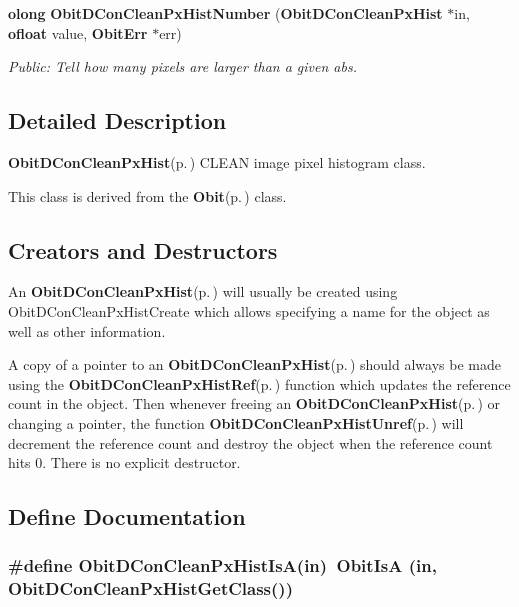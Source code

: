 \begin{CompactItemize}
{\bf olong} {\bf Obit\-DCon\-Clean\-Px\-Hist\-Number} ({\bf Obit\-DCon\-Clean\-Px\-Hist} $\ast$in, {\bf ofloat} value, {\bf Obit\-Err} $\ast$err)
\begin{CompactList}\small\item\em Public: Tell how many pixels are larger than a given abs. \item\end{CompactList}\end{CompactItemize}


\subsection{Detailed Description}
{\bf Obit\-DCon\-Clean\-Px\-Hist}{\rm (p.\,\pageref{structObitDConCleanPxHist})} CLEAN image pixel histogram class. 

This class is derived from the {\bf Obit}{\rm (p.\,\pageref{structObit})} class.\subsection{Creators and Destructors}\label{ObitDConCleanPxHist_8h_ObitDConCleanPxHistaccess}
An {\bf Obit\-DCon\-Clean\-Px\-Hist}{\rm (p.\,\pageref{structObitDConCleanPxHist})} will usually be created using Obit\-DCon\-Clean\-Px\-Hist\-Create which allows specifying a name for the object as well as other information.

A copy of a pointer to an {\bf Obit\-DCon\-Clean\-Px\-Hist}{\rm (p.\,\pageref{structObitDConCleanPxHist})} should always be made using the {\bf Obit\-DCon\-Clean\-Px\-Hist\-Ref}{\rm (p.\,\pageref{ObitDConCleanPxHist_8h_a1})} function which updates the reference count in the object. Then whenever freeing an {\bf Obit\-DCon\-Clean\-Px\-Hist}{\rm (p.\,\pageref{structObitDConCleanPxHist})} or changing a pointer, the function {\bf Obit\-DCon\-Clean\-Px\-Hist\-Unref}{\rm (p.\,\pageref{ObitDConCleanPxHist_8h_a0})} will decrement the reference count and destroy the object when the reference count hits 0. There is no explicit destructor.

\subsection{Define Documentation}
\subsubsection{\setlength{\rightskip}{0pt plus 5cm}\#define Obit\-DCon\-Clean\-Px\-Hist\-Is\-A(in)\ Obit\-Is\-A (in, Obit\-DCon\-Clean\-Px\-Hist\-Get\-Class())}\label{ObitDConCleanPxHist_8h_a2}


